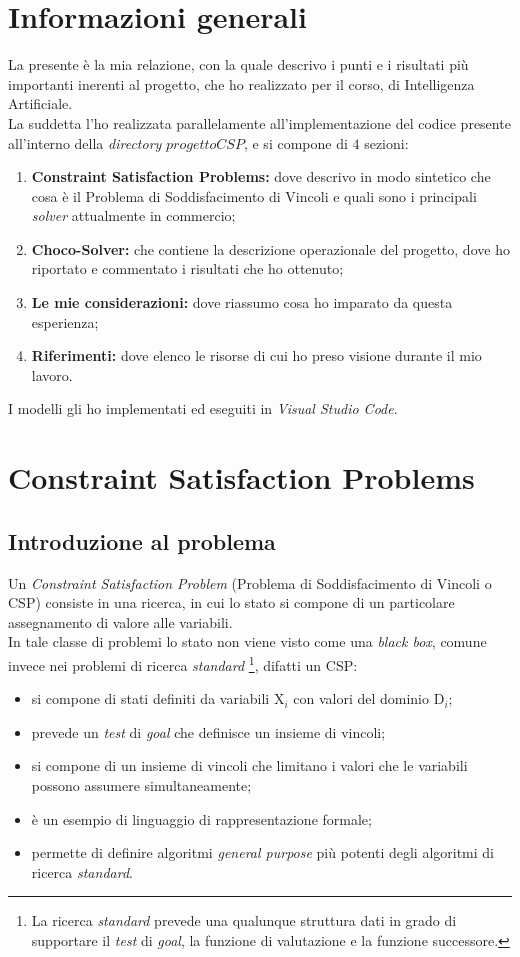 
\section{Informazioni generali}
La presente \`e la mia relazione, con la quale descrivo i punti e i risultati pi\`u importanti inerenti al progetto, che ho realizzato per il corso, di Intelligenza Artificiale.\\
La suddetta l'ho realizzata parallelamente all'implementazione del codice presente all'interno della \textit{directory} $progettoCSP$, e si compone di $4$ sezioni:
\begin{enumerate}
\item \textbf{Constraint Satisfaction Problems:} dove descrivo in modo sintetico che cosa \`e il Problema di Soddisfacimento di Vincoli e quali sono i principali \textit{solver} attualmente in commercio;
\item \textbf{Choco-Solver:} che contiene la descrizione operazionale del progetto, dove ho riportato e commentato i risultati che ho ottenuto;
\item \textbf{Le mie considerazioni:} dove riassumo cosa ho imparato da questa esperienza;
\item \textbf{Riferimenti:} dove elenco le risorse di cui ho preso visione durante il mio lavoro.
\end{enumerate}
\noindent
I modelli gli ho implementati ed eseguiti in \textit{Visual Studio Code}.
\newpage


\section{Constraint Satisfaction Problems}
\subsection{Introduzione al problema}
Un \textit{Constraint Satisfaction Problem} (Problema di Soddisfacimento di Vincoli o CSP) consiste in una ricerca, in cui lo stato si compone di un particolare assegnamento di valore alle variabili.\\ In tale classe di problemi lo stato non viene visto come una \textit{black box}, comune invece nei problemi di ricerca \textit{standard} \footnote{La ricerca \textit{standard} prevede una qualunque struttura dati in grado di supportare il \textit{test} di \textit{goal}, la funzione di valutazione e la funzione successore.}, difatti un CSP:
\begin{itemize}
\item si compone di stati definiti da variabili X$_i$ con valori del dominio D$_i$;
\item prevede un \textit{test} di \textit{goal} che definisce un insieme di vincoli;
\item si compone di un insieme di vincoli che limitano i valori che le variabili possono assumere simultaneamente;
\item \`e un esempio di linguaggio di rappresentazione formale;
\item permette di definire algoritmi \textit{general purpose} pi\`u potenti degli algoritmi di ricerca \textit{standard}.
\end{itemize}

